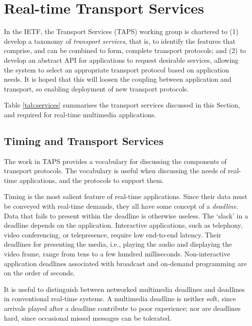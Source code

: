 \documentclass[10pt]{sig-alternate-05-2015}
\newcommand{\ie}{{i.e.,}\xspace}
\begin{document}
\section{Real-time Transport Services}
\label{sec:services}

In the IETF, the Transport Services (TAPS) working group is chartered to
(1) develop a taxonomy of \emph{transport services}, that is, to identify the
features that comprise, and can be combined to form, complete transport
protocols; and (2) to develop an abstract API for applications to request
desirable services, allowing the system to select an appropriate transport
protocol based on application needs. It is hoped that this will loosen the
coupling between application and transport, so enabling deployment of new
transport protocols.

Table \ref{tab:services} summarises the transport services discussed in this
Section, and required for real-time multimedia applications.
\subsection{Timing and Transport Services}

The work in TAPS provides a vocabulary for discussing the components of
transport protocols.  The vocabulary is useful when discussing the needs of
real-time applications, and the protocols to support them.

Timing is the most salient feature of real-time applications. Since their data
must be conveyed with real-time demands, they all have some concept of a
\emph{deadline}. Data that fails to present within the deadline is otherwise
useless.
The `slack' in a deadline depends on the application. Interactive applications,
such as telephony, video conferencing, or telepresence, require low end-to-end
latency. Their deadlines for presenting the media, \ie playing the audio and
displaying the video frame, range from tens to a few hundred milliseconds.
Non-interactive application deadlines associated with broadcast and on-demand
programming are on the order of seconds.

It is useful to distinguish between networked multimedia deadlines and
deadlines in conventional real-time systems. A multimedia deadline is neither
soft, since arrivals played after a deadline contribute to poor experience; nor
are deadlines hard, since occasional missed messages can be tolerated.
\end{document}

